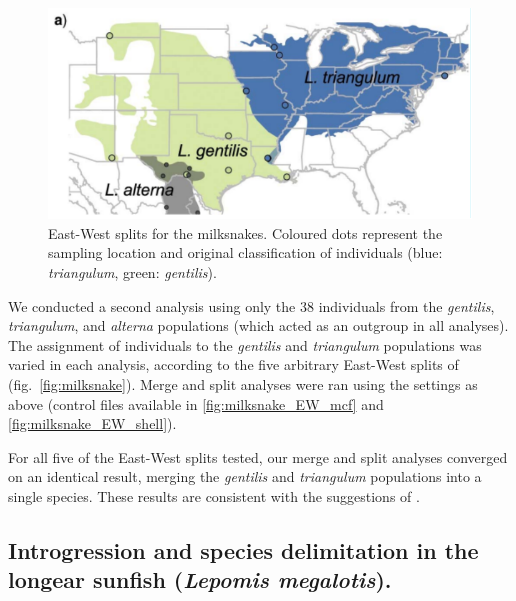 \documentclass{article1}
\newcommand{\red}[1]{{\color{red}{#1}}}
\newcommand{\blue}[1]{{\color{blue}{#1}}}
\begin{document}
\begin{figure}[t]
	\centering %
	\includegraphics[scale=0.5]{figs/miksnakes_EW} %
	
	\caption{East-West splits for the milksnakes.  Coloured dots represent the sampling
	location and original classification of individuals (blue: \textit{triangulum}, green:
	\textit{gentilis}). %
	} \label{fig:milksnake_EW}
\end{figure} 

We conducted a second analysis using only the 38 individuals from the \textit{gentilis},
\textit{triangulum}, and \textit{alterna} populations (which acted as an outgroup in all
analyses).  The assignment of individuals to the \textit{gentilis} and \textit{triangulum}
populations was varied in each analysis, according to the five arbitrary East-West splits
of \cite{Chambers2020} (fig.~\ref{fig:milksnake}).  Merge and split analyses were ran
using the settings as above (control files available in \ref{fig:milksnake_EW_mcf} and
\ref{fig:milksnake_EW_shell}).

For all five of the East-West splits tested, our merge and split analyses converged on an
identical result, merging the \textit{gentilis} and \textit{triangulum} populations into a
single species.  These results are consistent with the suggestions of \cite{Chambers2020}.

\red{[Comment on the $\sim$0 estimates of migration rates between geographic populations.]}\blue{[As patterns of hybridization or migration for nuclear genes were not specified in the Chambers and Hillis paper, and only nuclear genes were used in the analysis, the model was run without migration (just MSC), thus no migration rates were estimated (See control files in S5 an S6)]}


\subsection{Introgression and species delimitation in the longear sunfish (\emph{Lepomis
megalotis}).}
\end{document}
